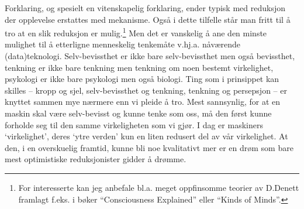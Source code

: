 \documentclass[10pt,twocolumn,leqno]{article}
\newcommand{\<}{\langle}
\renewcommand{\>}{\rangle}
\begin{document}
Forklaring, og spesielt en vitenskapelig forklaring, ender typisk med 
reduksjon der opplevelse erstattes med mekanisme. Ogs{\aa} i dette tilfelle 
st{\aa}r man fritt til 
{\aa} tro at en slik reduksjon er mulig.\footnote{For 
interesserte kan jeg anbefale bl.a. meget 
oppfinsomme teorier av D.Denett framlagt f.eks. i  b{\o}ker 
``Consciousness Explained'' eller ``Kinds of Minds''.} 
Men det er vanskelig {\aa} ane den minste mulighet til {\aa} etterligne 
menneskelig tenkem{\aa}te v.hj.a. n{\aa}v{\ae}rende (data)teknologi. 
Selv-bevissthet er ikke bare selv-bevissthet men ogs{\aa} bevissthet,
tenkning er ikke bare tenkning men tenkning om noen
bestemt virkelighet, psykologi er ikke bare psykologi men ogs{\aa} biologi. 
Ting som i prinsippet kan skilles 
-- kropp og sjel, selv-bevissthet og tenkning, tenkning og persepsjon -- 
er knyttet sammen mye n{\ae}rmere enn vi pleide {\aa} tro.
Mest sannsynlig, for at en maskin skal v{\ae}re selv-bevisst og 
kunne tenke som oss, m{\aa} 
den f{\o}rst kunne forholde seg til den samme virkeligheten som vi gj{\o}r. 
I dag er maskiners `virkelighet', deres `ytre verden' kun en liten 
redusert del av v{\aa}r virkelighet. At den, i en overskuelig framtid, kunne bli noe
kvalitativt mer er en dr{\o}m 
som bare mest optimistiske reduksjonister gidder {\aa} dr{\o}mme.
\end{document}
